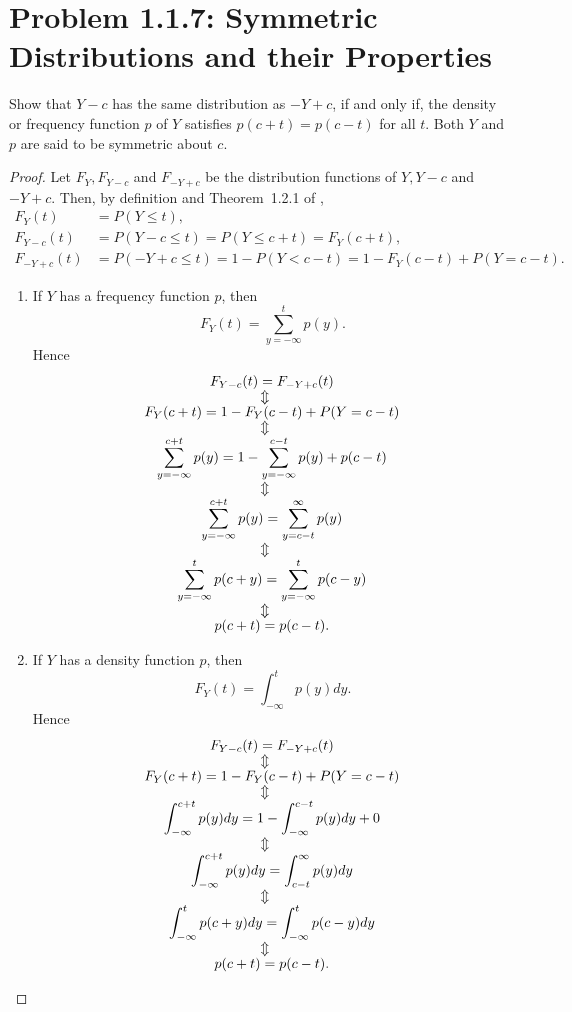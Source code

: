 \documentclass{amsbook}
\theoremstyle{definition}
\theoremstyle{remark}
\numberwithin{section}{chapter}
\numberwithin{equation}{chapter}
\begin{document}
\section{Problem 1.1.7: Symmetric Distributions and their Properties}
Show that $Y-c$ has the same distribution as $-Y+c$, if and only if, the density or frequency function $p$ of $Y$ satisfies $p(c+t)=p(c-t)$ for all $t$. Both $Y$ and $p$ are said to be symmetric about $c$.
\begin{proof}
Let $F_Y, F_{Y-c}$ and $F_{-Y+c}$ be the distribution functions of $Y,Y-c$ and $-Y+c$. Then, by definition and Theorem~1.2.1 of  \cite{durrett2019probability},\[
\begin{split}
F_Y(t)&=P(Y\leqslant t),\\
F_{Y-c}(t)&=P(Y-c\leqslant t)=P(Y\leqslant c+t)=F_Y(c+t),\\
F_{-Y+c}(t)&=P(-Y+c\leqslant t)=1-P(Y<c-t)=1-F_Y(c-t)+P(Y=c-t).
\end{split}
\]
\begin{enumerate}
\item If $Y$ has a frequency function $p$, then\[
F_Y(t)=\sum_{y=-\infty}^tp(y).
\]Hence
\begin{gather*}
F_{Y-c}(t)=F_{-Y+c}(t)\\
\ArrowBetweenLines
F_Y(c+t)=1-F_Y(c-t)+P(Y=c-t)\\
\ArrowBetweenLines
\sum_{y=-\infty}^{c+t}p(y)=1-\sum_{y=-\infty}^{c-t}p(y)+p(c-t)\\
\ArrowBetweenLines
\sum_{y=-\infty}^{c+t}p(y)=\sum_{y=c-t}^{\infty}p(y)\\
\ArrowBetweenLines
\sum_{y=-\infty}^{t}p(c+y)=\sum_{y=-\infty}^{t}p(c-y)\\
\ArrowBetweenLines
p(c+t)=p(c-t).\\
\end{gather*}
\item If $Y$ has a density function $p$, then\[
F_Y(t)=\int_{-\infty}^tp(y)dy.
\]Hence
\begin{gather*}
F_{Y-c}(t)=F_{-Y+c}(t)\\
\ArrowBetweenLines
F_Y(c+t)=1-F_Y(c-t)+P(Y=c-t)\\
\ArrowBetweenLines
\int_{-\infty}^{c+t}p(y)dy=1-\int_{-\infty}^{c-t}p(y)dy+0\\
\ArrowBetweenLines
\int_{-\infty}^{c+t}p(y)dy=\int_{c-t}^{\infty}p(y)dy\\
\ArrowBetweenLines
\int_{-\infty}^{t}p(c+y)dy=\int_{-\infty}^{t}p(c-y)dy\\
\ArrowBetweenLines
p(c+t)=p(c-t).\\
\end{gather*}
\end{enumerate}
\end{proof}
\end{document}
